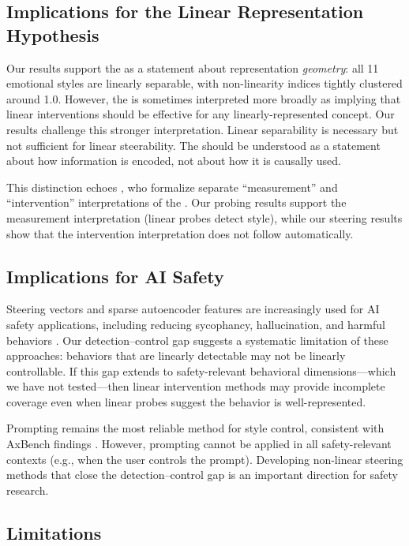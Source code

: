 \subsection{Implications for the Linear Representation Hypothesis}

Our results support the \lrh as a statement about representation \emph{geometry}: all 11 emotional styles are linearly separable, with non-linearity indices tightly clustered around 1.0. However, the \lrh is sometimes interpreted more broadly as implying that linear interventions should be effective for any linearly-represented concept. Our results challenge this stronger interpretation. Linear separability is necessary but not sufficient for linear steerability. The \lrh should be understood as a statement about how information is encoded, not about how it is causally used.

This distinction echoes \citet{park2023linear}, who formalize separate ``measurement'' and ``intervention'' interpretations of the \lrh. Our probing results support the measurement interpretation (linear probes detect style), while our steering results show that the intervention interpretation does not follow automatically.

\subsection{Implications for AI Safety}

Steering vectors and sparse autoencoder features are increasingly used for AI safety applications, including reducing sycophancy, hallucination, and harmful behaviors \citep{rimsky2024steering}. Our detection--control gap suggests a systematic limitation of these approaches: behaviors that are linearly detectable may not be linearly controllable. If this gap extends to safety-relevant behavioral dimensions---which we have not tested---then linear intervention methods may provide incomplete coverage even when linear probes suggest the behavior is well-represented.

Prompting remains the most reliable method for style control, consistent with AxBench findings \citep{wu2025axbench}. However, prompting cannot be applied in all safety-relevant contexts (e.g., when the user controls the prompt). Developing non-linear steering methods that close the detection--control gap is an important direction for safety research.

\subsection{Limitations}
\label{sec:limitations}

